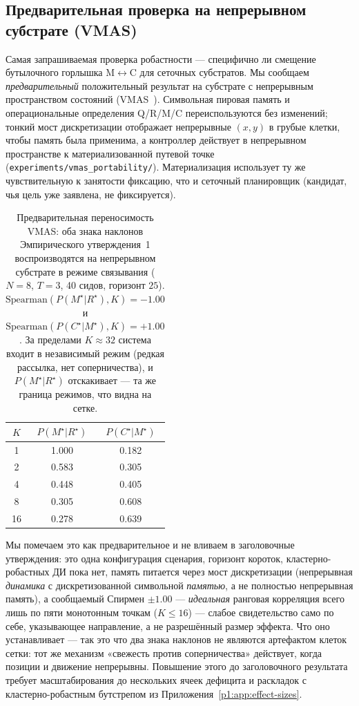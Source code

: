\documentclass{article}
\newcommand{\method}[1]{\texttt{#1}}
\begin{document}
\subsection{Предварительная проверка на непрерывном субстрате (VMAS)}
\label{p1:app:vmas}

Самая запрашиваемая проверка робастности --- специфично ли смещение бутылочного горлышка
M$\leftrightarrow$C для сеточных субстратов. Мы сообщаем \emph{предварительный}
положительный результат на субстрате с непрерывным пространством состояний (VMAS~\citep{bettini2022vmas}).
Символьная пировая память и операциональные определения Q/R/M/C переиспользуются
без изменений; тонкий мост дискретизации отображает непрерывные $(x,y)$ в грубые клетки,
чтобы память была применима, а контроллер действует в непрерывном пространстве к
материализованной путевой точке (\method{experiments/vmas\_portability/}). Материализация
использует ту же чувствительную к занятости фиксацию, что и сеточный планировщик (кандидат, чья
цель уже заявлена, не фиксируется).

\begin{table}[h]
\caption{Предварительная переносимость VMAS: оба знака наклонов Эмпирического утверждения~1 воспроизводятся на непрерывном субстрате в режиме связывания ($N{=}8$, $T{=}3$, 40 сидов, горизонт $25$). $\mathrm{Spearman}(P(M^\star|R^\star),K){=}-1.00$ и $\mathrm{Spearman}(P(C^\star|M^\star),K){=}+1.00$. За пределами $K\!\approx\!32$ система входит в независимый режим (редкая рассылка, нет соперничества), и $P(M^\star|R^\star)$ отскакивает --- та же граница режимов, что видна на сетке.}
\label{p1:tab:vmas}
\centering
\small
\begin{tabular}{c c c}
\toprule
$K$ & $P(M^\star|R^\star)$ & $P(C^\star|M^\star)$ \\
\midrule
1  & 1.000 & 0.182 \\
2  & 0.583 & 0.305 \\
4  & 0.448 & 0.405 \\
8  & 0.305 & 0.608 \\
16 & 0.278 & 0.639 \\
\bottomrule
\end{tabular}
\end{table}

Мы помечаем это как предварительное и не вливаем в заголовочные утверждения: это
одна конфигурация сценария, горизонт короток, кластерно-робастных ДИ пока нет,
память питается через мост дискретизации (непрерывная
\emph{динамика} с дискретизованной символьной \emph{памятью}, а не полностью непрерывная
память), а сообщаемый Спирмен $\pm1.00$ --- \emph{идеальная} ранговая
корреляция всего лишь по пяти монотонным точкам ($K\le16$) --- слабое свидетельство само по
себе, указывающее направление, а не разрешённый размер эффекта. Что оно устанавливает --- так это что два знака наклонов не являются артефактом
клеток сетки: тот же механизм «свежесть против соперничества» действует, когда позиции
и движение непрерывны. Повышение этого до заголовочного результата требует масштабирования
до нескольких ячеек дефицита и раскладок с кластерно-робастным бутстрепом из
Приложения~\ref{p1:app:effect-sizes}.
\end{document}
